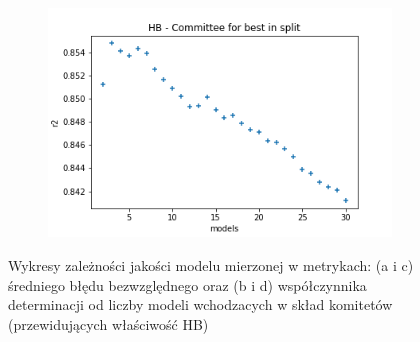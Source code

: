 \begin{figure}
\begin{subfigure}[b]{0.49\textwidth}
         \caption{}
         \label{fig:ea-split-mae-hb}
     \end{subfigure}
     \begin{subfigure}[b]{0.49\textwidth}
         \centering
         \includegraphics[width=\textwidth]{images/HB_split_r2.png}
         \caption{}
         \label{fig:ea-split-r2-hb}
     \end{subfigure}
        \caption{Wykresy zależności jakości modelu mierzonej w metrykach: (a i c) średniego błędu bezwzględnego oraz (b i d) współczynnika determinacji od liczby modeli wchodzacych w skład komitetów (przewidujących właściwość HB)}
        \label{fig:hb-committee}
\end{figure}

